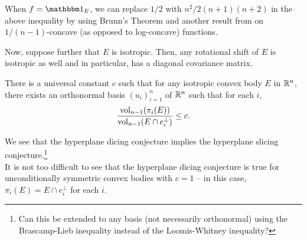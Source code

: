 \documentclass{article}
\begin{document}
	\begin{remark}
		When $f = \indic_E$, we can replace $1/2$ with $n^2/2(n+1)(n+2)$ in the above inequality by using Brunn's Theorem and another result from \cite{Fradelizi1999} on $1/(n-1)$-concave (as opposed to log-concave) functions.
	\end{remark}

	Now, suppose further that $E$ is isotropic. Then, any rotational shift of $E$ is isotropic as well and in particular, has a diagonal covariance matrix.

	\begin{fcon}
		There is a universal constant $c$ such that for any isotropic convex body $E$ in $\mathbb{R}^n$, there exists an orthonormal basis $(u_i)_{i=1}^n$ of $\mathbb{R}^n$ such that for each $i$,
		\[ \frac{\operatorname{vol}_{n-1}(\pi_i(E))}{\operatorname{vol}_{n-1}(E \cap e_i^\perp)} \le c. \]
	\end{fcon}

	We see that the hyperplane dicing conjecture implies the hyperplane slicing conjecture.\footnote{Can this be extended to any basis (not necessarily orthonormal) using the Brascamp-Lieb inequality instead of the Loomis-Whitney inequality?}\\
	
	It is not too difficult to see that the hyperplane dicing conjecture is true for unconditionally symmetric convex bodies with $c=1$ -- in this case, $\pi_i(E) = E \cap e_i^\perp$ for each $i$.




\end{document}
